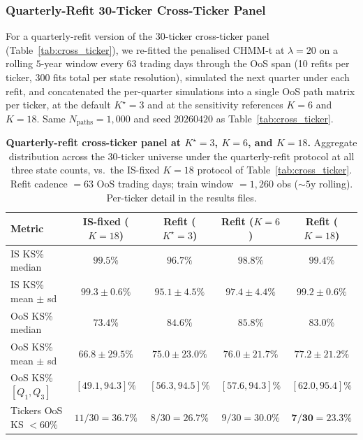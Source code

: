 \subsubsection{Quarterly-Refit 30-Ticker Cross-Ticker Panel}
\label{sec:cross_ticker_quarterly_refit}

For a quarterly-refit version of the 30-ticker cross-ticker panel (Table~\ref{tab:cross_ticker}), we re-fitted the penalised CHMM-t at $\lambda = 20$ on a rolling $5$-year window every $63$ trading days through the OoS span (10 refits per ticker, 300 fits total per state resolution), simulated the next quarter under each refit, and concatenated the per-quarter simulations into a single OoS path matrix per ticker, at the default $K^\star = 3$ and at the sensitivity references $K = 6$ and $K = 18$. Same $N_{\text{paths}} = 1{,}000$ and seed $20260420$ as Table~\ref{tab:cross_ticker}.

\begin{table}[!ht]
\centering
\small
\caption{\textbf{Quarterly-refit cross-ticker panel at $K^\star = 3$, $K = 6$, and $K = 18$.} Aggregate distribution across the 30-ticker universe under the quarterly-refit protocol at all three state counts, vs.\ the IS-fixed $K = 18$ protocol of Table~\ref{tab:cross_ticker}. Refit cadence $= 63$ OoS trading days; train window $= 1{,}260$ obs ($\sim 5$y rolling). Per-ticker detail in the results files.}
\label{tab:cross_ticker_quarterly_refit}
\begin{tabular}{l c c c c}
\toprule
Metric & IS-fixed ($K = 18$) & Refit ($K^\star = 3$) & Refit ($K = 6$) & Refit ($K = 18$) \\
\midrule
IS KS\% median        & $99.5\%$ & $96.7\%$ & $98.8\%$ & $99.4\%$ \\
IS KS\% mean $\pm$ sd & $99.3 \pm 0.6\%$ & $95.1 \pm 4.5\%$ & $97.4 \pm 4.4\%$ & $99.2 \pm 0.6\%$ \\
OoS KS\% median       & $73.4\%$ & $84.6\%$ & $\mathbf{85.8\%}$ & $83.0\%$ \\
OoS KS\% mean $\pm$ sd & $66.8 \pm 29.5\%$ & $75.0 \pm 23.0\%$ & $\mathbf{76.0 \pm 21.7\%}$ & $77.2 \pm 21.2\%$ \\
OoS KS\% $[Q_1, Q_3]$ & $[49.1, 94.3]\%$ & $[56.3, 94.5]\%$ & $[57.6, 94.3]\%$ & $[62.0, 95.4]\%$ \\
Tickers OoS KS $< 60\%$ & $11 / 30 = 36.7\%$ & $8 / 30 = 26.7\%$ & $9 / 30 = 30.0\%$ & $\mathbf{7 / 30 = 23.3\%}$ \\
\bottomrule
\end{tabular}
\end{table}

